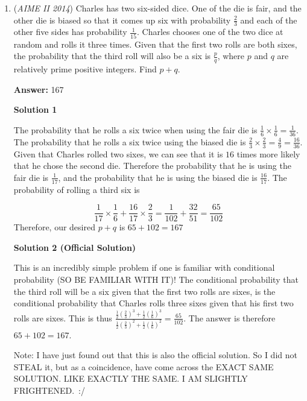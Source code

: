 \begin{enumerate}
 


	\item (\textit{AIME II 2014}) Charles has two six-sided dice. One of the die is fair, and the other die is biased so that it comes up six with probability $\frac{2}{3}$ and each of the other five sides has probability $\frac{1}{15}$. Charles chooses one of the two dice at random and rolls it three times. Given that the first two rolls are both sixes, the probability that the third roll will also be a six is $\frac{p}{q}$, where $p$ and $q$ are relatively prime positive integers. Find $p+q$. 


 
 \textbf{Answer: }167



\textbf{Solution 1}

The probability that he rolls a six twice when using the fair die is $\frac{1}{6}\times \frac{1}{6}=\frac{1}{36}$.  The probability that he rolls a six twice using the biased die is $\frac{2}{3}\times \frac{2}{3}=\frac{4}{9}=\frac{16}{36}$.  Given that Charles rolled two sixes, we can see that it is $16$ times more likely that he chose the second die.  Therefore the probability that he is using the fair die is $\frac{1}{17}$, and the probability that he is using the biased die is $\frac{16}{17}$.  The probability of rolling a third six is

 
 \[\frac{1}{17}\times \frac{1}{6} + \frac{16}{17} \times \frac{2}{3} = \frac{1}{102}+\frac{32}{51}=\frac{65}{102}\]Therefore, our desired $p+q$ is $65+102= \boxed{167}$




\textbf{Solution 2 (Official Solution)}

This is an incredibly simple problem if one is familiar with conditional probability (SO BE FAMILIAR WITH IT)! The conditional probability that the third roll will be a six given that the first two rolls are sixes, is the conditional probability that Charles rolls three sixes given that his first two rolls are sixes. This is thus $\frac{\frac{1}{2}(\frac{2}{3})^3+\frac{1}{2}(\frac{1}{6})^3}{\frac{1}{2}(\frac{2}{3})^2+\frac{1}{2}(\frac{1}{6})^2}= \frac{65}{102}$. The answer is therefore $65+102= \boxed {167}$.

 Note: I have just found out that this is also the official solution. So I did not STEAL it, but as a coincidence, have come across the EXACT SAME SOLUTION. LIKE EXACTLY THE SAME. I AM SLIGHTLY FRIGHTENED. :/

 



\end{enumerate}
